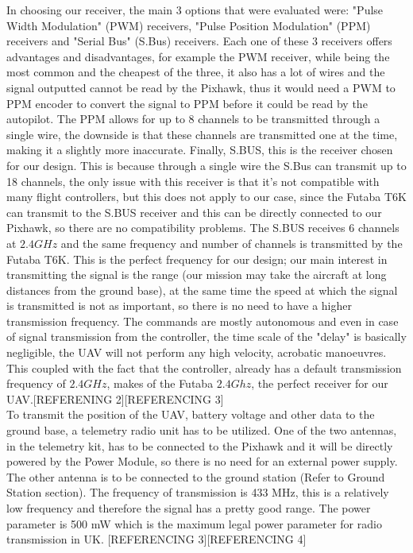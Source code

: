 \documentclass[12pt]{article}
\begin{document}
\noindent In choosing our receiver, the main 3 options that were evaluated were: "Pulse Width Modulation" (PWM) receivers, "Pulse Position Modulation" (PPM) receivers and "Serial Bus" (S.Bus) receivers. Each one of these 3 receivers offers advantages and disadvantages, for example the PWM receiver, while being the most common and the cheapest of the three, it also has a lot of wires and the signal outputted cannot be read by the Pixhawk, thus it would need a PWM to PPM encoder to convert the signal to PPM before it could be read by the autopilot. The PPM allows for up to 8 channels to be transmitted through a single wire, the downside is that these channels are transmitted one at the time, making it a slightly more inaccurate. Finally, S.BUS, this is the receiver chosen for our design. This is because through a single wire the S.Bus can transmit up to 18 channels, the only issue with this receiver is that it's not compatible with many flight controllers, but this does not apply to our case, since the Futaba T6K can transmit to the S.BUS receiver and this can be directly connected to our Pixhawk, so there are no compatibility problems. The S.BUS receives 6 channels at $2.4GHz$ and the same frequency and number of channels is transmitted by the Futaba T6K. This is the perfect frequency for our design; our main interest in transmitting the signal is the range (our mission may take the aircraft at long distances from the ground base), at the same time the speed at which the signal is transmitted is not as important, so there is no need to have a higher transmission frequency. The commands are mostly autonomous and even in case of signal transmission from the controller, the time scale of the "delay" is basically negligible, the UAV will not perform any high velocity, acrobatic manoeuvres. This coupled with the fact that the controller, already has a default transmission frequency of $2.4GHz$, makes of the Futaba $2.4Ghz$, the perfect receiver for our UAV.[REFERENING 2][REFERENCING 3] \\

\noindent To transmit the position of the UAV, battery voltage and other data to the ground base, a telemetry radio unit has to be utilized. One of the two antennas, in the telemetry kit, has to be connected to the Pixhawk and it will be directly powered by the Power Module, so there is no need for an external power supply. The other antenna is to be connected to the ground station (Refer to Ground Station section). The frequency of transmission is 433 MHz, this is a relatively low frequency and therefore the signal has a pretty good range. The power parameter is 500 mW which is the maximum legal power parameter for radio transmission in UK. [REFERENCING 3][REFERENCING 4] \\
\end{document}
